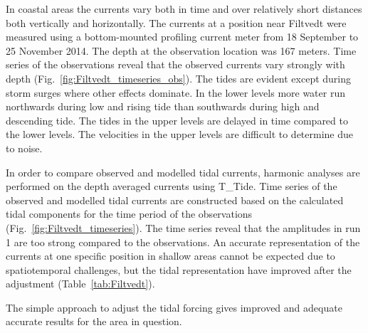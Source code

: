 In coastal areas the currents vary both in time and over relatively short distances both vertically and horizontally. The currents at a position near Filtvedt were measured using a bottom-mounted profiling current meter from 18 September to 25 November 2014. The depth at the observation location was 167 meters. Time series of the observations reveal that the observed currents vary strongly with depth (Fig.~\ref{fig:Filtvedt_timeseries_obs}). The tides are evident except during storm surges where other effects dominate. In the lower levels more water run northwards during low and rising tide than southwards during high and descending tide. The tides in the upper levels are delayed in time compared to the lower levels. The velocities in the upper levels are difficult to determine due to noise. 

In order to compare observed and modelled tidal currents, harmonic analyses are performed on the depth averaged currents using T\_Tide. Time series of the observed and modelled tidal currents are constructed based on the calculated tidal components for the time period of the observations (Fig.~\ref{fig:Filtvedt_timeseries}). The time series reveal that the amplitudes in run 1 are too strong compared to the observations. 
An accurate representation of the currents at one specific position in shallow areas cannot be expected due to spatiotemporal challenges, but the tidal representation have improved after the adjustment (Table~\ref{tab:Filtvedt}). %

The simple approach to adjust the tidal forcing gives improved and adequate accurate results for the area in question. 



